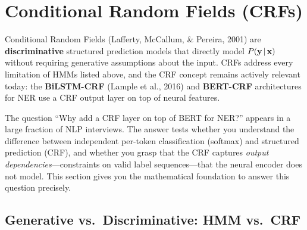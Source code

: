 \section{Conditional Random Fields (CRFs)}
\label{sec:crf}

Conditional Random Fields (Lafferty, McCallum, \& Pereira, 2001) are
\textbf{discriminative} structured prediction models that directly model
$P(\mathbf{y} \,|\, \mathbf{x})$ without requiring generative assumptions about the input.
CRFs address every limitation of HMMs listed above, and the CRF concept
remains actively relevant today: the \textbf{BiLSTM-CRF} (Lample et al.,
2016) and \textbf{BERT-CRF} architectures for NER use a CRF output layer
on top of neural features.

\begin{keyinsight}
The question ``Why add a CRF layer on top of BERT for NER?'' appears in a
large fraction of NLP interviews.  The answer tests whether you understand
the difference between independent per-token classification (softmax) and
structured prediction (CRF), and whether you grasp that the CRF captures
\emph{output dependencies}---constraints on valid label sequences---that the
neural encoder does not model.  This section gives you the mathematical
foundation to answer this question precisely.
\end{keyinsight}

\subsection{Generative vs.\ Discriminative: HMM vs.\ CRF}

